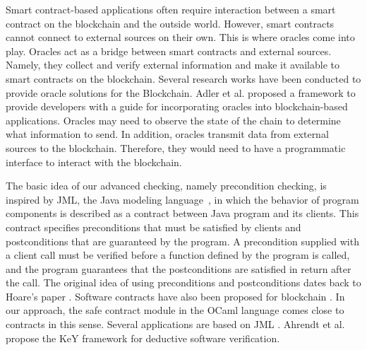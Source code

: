 \documentclass[a4paper,USenglish,american,cleveref, autoref, thm-restate]{oasics-v2021}
\begin{document}
Smart contract-based applications often require interaction between a smart contract on the blockchain and the outside world. However, smart contracts cannot connect to external sources on their own. This is where oracles \cite{oracle-patterns,call-action-oracle} come into play. Oracles act as a bridge between smart contracts and external sources. Namely, they collect and verify external information and make it available to smart contracts on the blockchain. Several research works have been conducted to provide oracle solutions for the Blockchain. Adler et al.\cite{blockchain-oracles} proposed a framework to provide developers with a guide for incorporating oracles into blockchain-based applications. Oracles may need to observe the state of the chain to determine what information to send. In addition, oracles transmit data from external sources to the blockchain. Therefore, they would need to have a programmatic interface to interact with the blockchain. %


The basic idea of our advanced checking, namely precondition checking,
is inspired by JML, the Java modeling
language~\cite{Leavens2006DesignBC, 101007}, in which the behavior of 
program components is described as a contract between Java
program and its clients. This contract specifies
preconditions that must be satisfied by clients and postconditions
that are guaranteed by the program. A precondition supplied with a
client call must be verified before a function defined by the program
is called, and the program guarantees that the postconditions are
satisfied in return after the call. The original idea of using
preconditions and postconditions dates back to Hoare's paper
\cite{101145}. Software contracts have also been proposed for
blockchain \cite{DBLP:journals/fbloc/Bartoletti20}.
In our approach, the safe contract module in the OCaml language comes
close to contracts in this sense. Several
applications are based on JML \cite{Tran2017}. Ahrendt et
al. \cite{keY} propose the KeY framework for deductive software
verification.  
\end{document}
